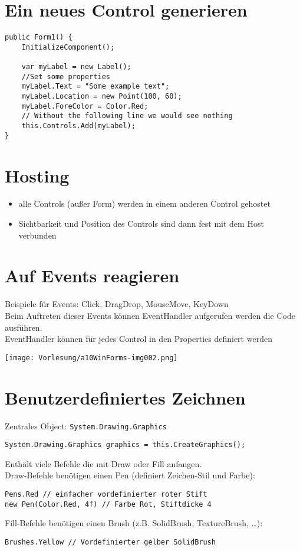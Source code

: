 \section{Ein neues Control generieren}

\begin{lstlisting}[language={[Sharp]C}]
public Form1() {
	InitializeComponent();

	var myLabel = new Label();
	//Set some properties
	myLabel.Text = "Some example text";
	myLabel.Location = new Point(100, 60);
	myLabel.ForeColor = Color.Red;
	// Without the following line we would see nothing
	this.Controls.Add(myLabel);
}
\end{lstlisting}

\section{Hosting}

\begin{itemize}
\item alle Controls (außer Form) werden in einem anderen Control gehostet
\item Sichtbarkeit und Position des Controls sind dann fest mit dem Host verbunden
\end{itemize}

\section{Auf Events reagieren}
Beispiele für Events: Click, DragDrop, MouseMove, KeyDown\\
Beim Auftreten dieser Events können EventHandler aufgerufen werden die Code ausführen. \\
EventHandler können für jedes Control in den Properties definiert werden

\begin{center}
\texttt{[image: Vorlesung/a10WinForms-img002.png]} 
\end{center}

\section{Benutzerdefiniertes Zeichnen}

Zentrales Object: \lstinline$System.Drawing.Graphics$
\begin{lstlisting}[language={[Sharp]C}]
System.Drawing.Graphics graphics = this.CreateGraphics();
\end{lstlisting}
Enthält viele Befehle die mit Draw oder Fill anfangen.\bigskip\\
Draw-Befehle benötigen einen Pen (definiert Zeichen-Stil und Farbe):
\begin{lstlisting}[language={[Sharp]C}]
Pens.Red // einfacher vordefinierter roter Stift
new Pen(Color.Red, 4f) // Farbe Rot, Stiftdicke 4
\end{lstlisting}\bigskip
Fill-Befehle benötigen einen Brush (z.B. SolidBrush, TextureBrush, …):
\begin{lstlisting}[language={[Sharp]C}]
Brushes.Yellow // Vordefinierter gelber SolidBrush
\end{lstlisting}

